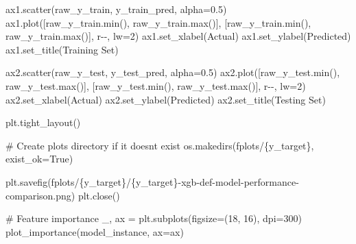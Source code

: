 \documentclass[
  letterpaper,
  DIV=11,
  numbers=noendperiod]{scrartcl}
\newenvironment{Shaded}{\begin{snugshade}}{\end{snugshade}}
\newcommand{\BuiltInTok}[1]{\textcolor[rgb]{0.00,0.23,0.31}{#1}}
\newcommand{\CommentTok}[1]{\textcolor[rgb]{0.37,0.37,0.37}{#1}}
\newcommand{\DecValTok}[1]{\textcolor[rgb]{0.68,0.00,0.00}{#1}}
\newcommand{\FloatTok}[1]{\textcolor[rgb]{0.68,0.00,0.00}{#1}}
\newcommand{\NormalTok}[1]{\textcolor[rgb]{0.00,0.23,0.31}{#1}}
\newcommand{\OperatorTok}[1]{\textcolor[rgb]{0.37,0.37,0.37}{#1}}
\newcommand{\SpecialCharTok}[1]{\textcolor[rgb]{0.37,0.37,0.37}{#1}}
\newcommand{\SpecialStringTok}[1]{\textcolor[rgb]{0.13,0.47,0.30}{#1}}
\newcommand{\StringTok}[1]{\textcolor[rgb]{0.13,0.47,0.30}{#1}}
\newcommand{\VariableTok}[1]{\textcolor[rgb]{0.07,0.07,0.07}{#1}}
\begin{document}
\begin{Shaded}
\begin{Highlighting}[]
\NormalTok{    ax1.scatter(raw\_y\_train, y\_train\_pred, alpha}\OperatorTok{=}\FloatTok{0.5}\NormalTok{)}
\NormalTok{    ax1.plot([raw\_y\_train.}\BuiltInTok{min}\NormalTok{(), raw\_y\_train.}\BuiltInTok{max}\NormalTok{()], [raw\_y\_train.}\BuiltInTok{min}\NormalTok{(), raw\_y\_train.}\BuiltInTok{max}\NormalTok{()], }\StringTok{\textquotesingle{}r{-}{-}\textquotesingle{}}\NormalTok{, lw}\OperatorTok{=}\DecValTok{2}\NormalTok{)}
\NormalTok{    ax1.set\_xlabel(}\StringTok{\textquotesingle{}Actual\textquotesingle{}}\NormalTok{)}
\NormalTok{    ax1.set\_ylabel(}\StringTok{\textquotesingle{}Predicted\textquotesingle{}}\NormalTok{)}
\NormalTok{    ax1.set\_title(}\StringTok{\textquotesingle{}Training Set\textquotesingle{}}\NormalTok{)}

\NormalTok{    ax2.scatter(raw\_y\_test, y\_test\_pred, alpha}\OperatorTok{=}\FloatTok{0.5}\NormalTok{)}
\NormalTok{    ax2.plot([raw\_y\_test.}\BuiltInTok{min}\NormalTok{(), raw\_y\_test.}\BuiltInTok{max}\NormalTok{()], [raw\_y\_test.}\BuiltInTok{min}\NormalTok{(), raw\_y\_test.}\BuiltInTok{max}\NormalTok{()], }\StringTok{\textquotesingle{}r{-}{-}\textquotesingle{}}\NormalTok{, lw}\OperatorTok{=}\DecValTok{2}\NormalTok{)}
\NormalTok{    ax2.set\_xlabel(}\StringTok{\textquotesingle{}Actual\textquotesingle{}}\NormalTok{)}
\NormalTok{    ax2.set\_ylabel(}\StringTok{\textquotesingle{}Predicted\textquotesingle{}}\NormalTok{)}
\NormalTok{    ax2.set\_title(}\StringTok{\textquotesingle{}Testing Set\textquotesingle{}}\NormalTok{)}

\NormalTok{    plt.tight\_layout()}

    \CommentTok{\# Create \textquotesingle{}plots\textquotesingle{} directory if it doesn\textquotesingle{}t exist}
\NormalTok{    os.makedirs(}\SpecialStringTok{f\textquotesingle{}plots/}\SpecialCharTok{\{}\NormalTok{y\_target}\SpecialCharTok{\}}\SpecialStringTok{\textquotesingle{}}\NormalTok{, exist\_ok}\OperatorTok{=}\VariableTok{True}\NormalTok{)}

\NormalTok{    plt.savefig(}\SpecialStringTok{f\textquotesingle{}plots/}\SpecialCharTok{\{}\NormalTok{y\_target}\SpecialCharTok{\}}\SpecialStringTok{/}\SpecialCharTok{\{}\NormalTok{y\_target}\SpecialCharTok{\}}\SpecialStringTok{{-}xgb{-}def{-}model{-}performance{-}comparison.png\textquotesingle{}}\NormalTok{)}
\NormalTok{    plt.close()}

    \CommentTok{\# Feature importance}
\NormalTok{    \_, ax }\OperatorTok{=}\NormalTok{ plt.subplots(figsize}\OperatorTok{=}\NormalTok{(}\DecValTok{18}\NormalTok{, }\DecValTok{16}\NormalTok{), dpi}\OperatorTok{=}\DecValTok{300}\NormalTok{)}
\NormalTok{    plot\_importance(model\_instance, ax}\OperatorTok{=}\NormalTok{ax)}


\end{Highlighting}
\end{Shaded}
\end{document}
